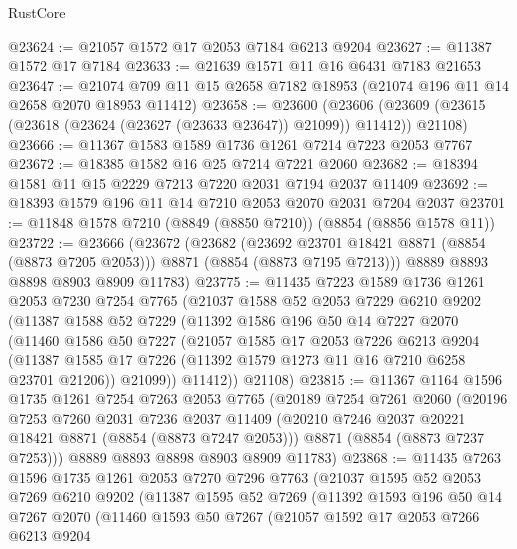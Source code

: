 \begin{lexlean}{RustCore}
\begin{coremodule}
@23624 := @21057 @1572 @17 @2053 @7184 @6213 @9204
@23627 := @11387 @1572 @17 @7184
@23633 := @21639 @1571 @11 @16 @6431 @7183 @21653
@23647 := @21074 @709 @11 @15 @2658 @7182 @18953 (@21074 @196 @11 @14 @2658 @2070 @18953 @11412)
@23658 := @23600
    (@23606 (@23609 (@23615 (@23618 (@23624 (@23627 (@23633 @23647)) @21099)) @11412)) @21108)
@23666 := @11367 @1583 @1589 @1736 @1261 @7214 @7223 @2053 @7767
@23672 := @18385 @1582 @16 @25 @7214 @7221 @2060
@23682 := @18394 @1581 @11 @15 @2229 @7213 @7220 @2031 @7194 @2037 @11409
@23692 := @18393 @1579 @196 @11 @14 @7210 @2053 @2070 @2031 @7204 @2037
@23701 := @11848 @1578 @7210 (@8849 (@8850 @7210)) (@8854 (@8856 @1578 @11))
@23722 := @23666
    (@23672
      (@23682
        (@23692 @23701 @18421 @8871 (@8854 (@8873 @7205 @2053)))
        @8871
        (@8854 (@8873 @7195 @7213)))
      @8889
      @8893
      @8898
      @8903
      @8909
      @11783)
@23775 := @11435
    @7223
    @1589
    @1736
    @1261
    @2053
    @7230
    @7254
    @7765
    (@21037
      @1588
      @52
      @2053
      @7229
      @6210
      @9202
      (@11387
        @1588
        @52
        @7229
        (@11392
          @1586
          @196
          @50
          @14
          @7227
          @2070
          (@11460
            @1586
            @50
            @7227
            (@21057
              @1585
              @17
              @2053
              @7226
              @6213
              @9204
              (@11387 @1585 @17 @7226 (@11392 @1579 @1273 @11 @16 @7210 @6258 @23701 @21206))
              @21099))
          @11412))
      @21108)
@23815 := @11367
    @1164
    @1596
    @1735
    @1261
    @7254
    @7263
    @2053
    @7765
    (@20189
      @7254
      @7261
      @2060
      (@20196
        @7253
        @7260
        @2031
        @7236
        @2037
        @11409
        (@20210 @7246 @2037 @20221 @18421 @8871 (@8854 (@8873 @7247 @2053)))
        @8871
        (@8854 (@8873 @7237 @7253)))
      @8889
      @8893
      @8898
      @8903
      @8909
      @11783)
@23868 := @11435
    @7263
    @1596
    @1735
    @1261
    @2053
    @7270
    @7296
    @7763
    (@21037
      @1595
      @52
      @2053
      @7269
      @6210
      @9202
      (@11387
        @1595
        @52
        @7269
        (@11392
          @1593
          @196
          @50
          @14
          @7267
          @2070
          (@11460
            @1593
            @50
            @7267
            (@21057
              @1592
              @17
              @2053
              @7266
              @6213
              @9204

\end{coremodule}
\end{lexlean}
